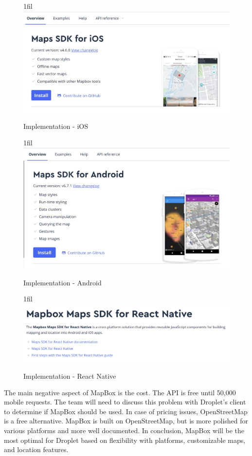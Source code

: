 \documentclass[draftclsnofoot, onecolumn, letterpaper,10pt,compsoc]{IEEEtran}
\makeatletter
\newcommand*{\centerfloat}{%
  \parindent \z@
  \leftskip \z@ \@plus 1fil \@minus \textwidth
  \rightskip\leftskip
  \parfillskip \z@skip}
\newcommand*{\centerfloat}{%
  \parindent \z@
  \leftskip \z@ \@plus 1fil \@minus \textwidth
  \rightskip\leftskip
  \parfillskip \z@skip}
\makeatother
\begin{document}
\begin{figure}[H]
    \centerfloat
    \includegraphics[scale=.2]{images/MapBoxiOS.jpg}
    \caption{Implementation - iOS}
    \label{fig:my_label}
\end{figure}
\begin{figure}[H]
    \centerfloat
    \includegraphics[scale=.2]{images/MapBoxAndroid.jpg}
    \caption{Implementation - Android}
    \label{fig:my_label}
\end{figure}
\begin{figure}[H]
    \centerfloat
    \includegraphics[scale=.2]{images/MapBoxReactNative.jpg}
    \caption{Implementation - React Native}
    \label{fig:my_label}
\end{figure}

The main negative aspect of MapBox is the cost. The API is free until 50,000 mobile requests. The team will need to discuss this problem with Droplet's client to determine if MapBox should be used. In case of pricing issues, OpenStreetMap is a free alternative. MapBox is built on OpenStreetMap, but is more polished for various platforms and more well documented. In conclusion, MapBox will be the most optimal for Droplet based on flexibility with platforms, customizable maps, and location features. 
\end{document}
